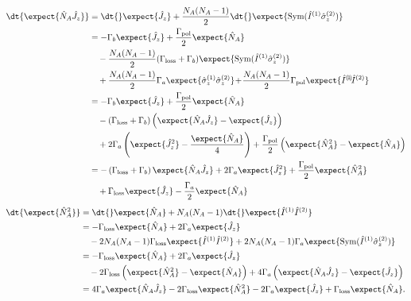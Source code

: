 \documentclass[]{report}
\begin{document}
\begin{align}
\dt{\expect{\hat{N}_A\hat{J}_z}} &=\dt{} \expect{\hat{J}_z } + \frac{N_A(N_A-1)}{2} \dt{}\expect{\mathrm{Sym}(\hat{I}^{(1)}\hat{\sigma}_z^{(2)} ) }\\
&= -\Gamma_b \expect{\hat{J}_z} +\frac{\Gamma_{\rm pol}}{2}\expect{\hat{N}_A} \nonumber\\
&\quad -\frac{N_A(N_A-1)}{2}(\Gamma_{\rm loss}+\Gamma_b) \expect{\mathrm{Sym}( \hat{I}^{(1)}\hat{\sigma}_z^{(2)} ) }\nonumber\\
&\quad +\frac{N_A(N_A-1)}{2}\Gamma_a\expect{\hat{\sigma}_z^{(1)} \hat{\sigma}_z^{(2)}} \!+\! \frac{N_A(N_A-1)}{2}\Gamma_{\rm pol} \expect{\hat{I}^{(\!1\!)}\!\hat{I}^{(2)} }\\
&= -\Gamma_b \expect{\hat{J}_z} +\frac{\Gamma_{\rm pol}}{2}\expect{\hat{N}_A} \nonumber\\
&\quad -(\Gamma_{\rm loss}+\Gamma_b) \left( \expect{ \hat{N}_A\hat{J}_z }-\expect{\hat{J}_z}\right)\nonumber\\
&\quad+2\Gamma_a\left(\expect{\hat{J}_z^2 }-\frac{\expect{\hat{N}_A}}{4}\right)+\frac{\Gamma_{\rm pol}}{2}\left(\expect{\hat{N}_A^2}-\expect{\hat{N}_A}\right)\\
&=-\left(\Gamma_{\rm loss}+\Gamma_b\right)\expect{\hat{N}_A \hat{J}_z} +2\Gamma_a\expect{\hat{J}_z^2}+\frac{\Gamma_{\rm pol}}{2}\expect{\hat{N}_A^2 }\nonumber\\ 
&\quad+\Gamma_{\rm loss} \expect{\hat{J}_z} -\frac{\Gamma_a}{2}\expect{\hat{N}_A}
\end{align}
\begin{align}
\dt{\expect{\hat{N}_A^2}} &= \dt{}\expect{\hat{N}_A} + N_A(N_A-1)\dt{}\expect{\hat{I}^{(1)}\hat{I}^{(2)}}\\
&= -\Gamma_{\rm loss}\expect{\hat{N}_A} +2\Gamma_a \expect{\hat{J}_z}\nonumber\\
&\quad -2N_A(N_A-1)\Gamma_{\rm loss}\expect{\hat{I}^{(1)} \hat{I}^{(2)}} +2N_A(N_A-1)\Gamma_a\expect{\mathrm{Sym}(\hat{I}^{(1)} \hat{\sigma}_z^{(2)})}\nonumber\\
&= -\Gamma_{\rm loss}\expect{\hat{N}_A} +2\Gamma_a \expect{\hat{J}_z}\nonumber\\
&\quad - 2\Gamma_{\rm loss} \left(\expect{\hat{N}_A^2}-\expect{\hat{N}_A} \right) + 4\Gamma_a \left(\expect{\hat{N}_A\hat{J}_z} -\expect{\hat{J}_z} \right)\\
&= 4\Gamma_a \expect{\hat{N}_A\hat{J}_z} -2\Gamma_{\rm loss}\expect{\hat{N}_A^2} -2\Gamma_a \expect{\hat{J}_z} +\Gamma_{\rm loss}\expect{\hat{N}_A} .
\end{align}
\end{document}
